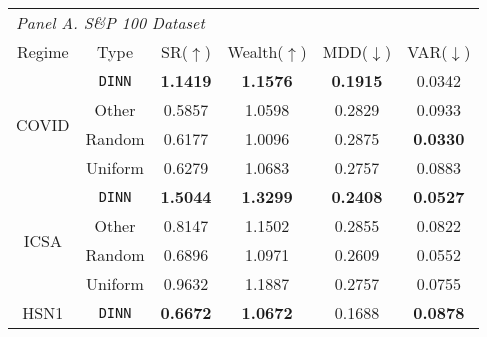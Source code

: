 
\centering
{\fontsize{8pt}{11pt}\selectfont
\begin{tabular}{cccccc}
\hline
\multicolumn{6}{l}{\textit{Panel A. S\&P 100 Dataset}}                                                              \\
Regime                 & Type        & SR($\uparrow$)  & Wealth($\uparrow$) & MDD($\downarrow$) & VAR($\downarrow$) \\ \hline
\multirow{4}{*}{COVID} & \texttt{DINN} & \textbf{1.1419} & \textbf{1.1576}    & \textbf{0.1915}   & 0.0342            \\
                       & Other       & 0.5857          & 1.0598             & 0.2829            & 0.0933            \\
                       & Random      & 0.6177          & 1.0096             & 0.2875            & \textbf{0.0330}   \\
                       & Uniform     & 0.6279          & 1.0683             & 0.2757            & 0.0883            \\ \hline
\multirow{4}{*}{ICSA}  & \texttt{DINN} & \textbf{1.5044} & \textbf{1.3299}    & \textbf{0.2408}   & \textbf{0.0527}   \\
                       & Other       & 0.8147          & 1.1502             & 0.2855            & 0.0822            \\
                       & Random      & 0.6896          & 1.0971             & 0.2609            & 0.0552            \\
                       & Uniform     & 0.9632          & 1.1887             & 0.2757            & 0.0755            \\ \hline
\multirow{4}{*}{HSN1}  & \texttt{DINN} & \textbf{0.6672} & \textbf{1.0672}    & 0.1688            & \textbf{0.0878}   \\

\end{tabular}}
